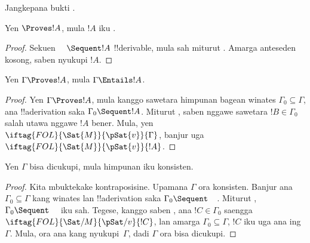 \documentclass[../../../include/open-logic-section]{subfiles}
\begin{document}
\begin{prob}
Jangkepana bukti .
\end{prob}
\tagendprob

\begin{cor}
Yen $\Proves !A$, mula $!A$ iku .
\end{cor}
\begin{proof}
Sekuen $\quad\Sequent !A$ !!{derivable}, mula sah miturut
. Amarga anteseden kosong, saben
 nyukupi $!A$.
\end{proof}

\begin{cor}
Yen $\Gamma \Proves !A$, mula $\Gamma \Entails !A$.
\end{cor}

\begin{proof}
Yen $\Gamma \Proves !A$, mula kanggo sawetara himpunan bagean winates
$\Gamma_0 \subseteq \Gamma$, ana !!a{derivation} saka $\Gamma_0
\Sequent !A$. Miturut , saben
nggawe sawetara $!B \in \Gamma_0$ salah utawa nggawe $!A$ bener. Mula,
yen $\iftag{FOL}{\Sat{M}}{\pSat{v}}{\Gamma}$, banjur uga
$\iftag{FOL}{\Sat{M}}{\pSat{v}}{!A}$.
\end{proof}

\begin{cor}
Yen $\Gamma$ bisa dicukupi, mula himpunan iku konsisten.
\end{cor}

\begin{proof}
Kita mbuktekake kontraposisine. Upamana $\Gamma$ ora konsisten. Banjur
ana $\Gamma_0 \subseteq \Gamma$ kang winates lan !!a{derivation} saka
$\Gamma_0 \Sequent \quad$. Miturut
, $\Gamma_0 \Sequent \quad$ iku sah.
Tegese, kanggo saben
,
ana $!C \in \Gamma_0$ saengga
$\iftag{FOL}{\Sat/{M}}{\pSat/{v}}{!C}$, lan amarga $\Gamma_0
\subseteq \Gamma$, $!C$ iku uga ana ing~$\Gamma$. Mula, ora ana
 kang nyukupi~$\Gamma$, dadi
$\Gamma$ ora bisa dicukupi.
\end{proof}
\end{document}
